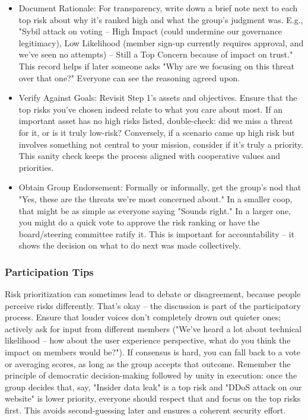 \begin{itemize}
    \item Document Rationale: For transparency, write down a brief note next to each top risk about why it's
    ranked high and what the group's judgment was. E.g., "Sybil attack on voting – High Impact (could undermine
    our governance legitimacy), Low Likelihood (member sign-up currently requires approval, and we've seen no
    attempts) – Still a Top Concern because of impact on trust." This record helps if later someone asks "Why are
    we focusing on this threat over that one?" Everyone can see the reasoning agreed upon.
    
    \item Verify Against Goals: Revisit Step 1's assets and objectives. Ensure that the top risks you've
    chosen indeed relate to what you care about most. If an important asset has no high risks listed,
    double-check: did we miss a threat for it, or is it truly low-risk? Conversely, if a scenario came up high
    risk but involves something not central to your mission, consider if it's truly a priority. This sanity check
    keeps the process aligned with cooperative values and priorities.
    
    \item Obtain Group Endorsement: Formally or informally, get the group's nod that "Yes, these are the
    threats we're most concerned about." In a smaller coop, that might be as simple as everyone saying "Sounds
    right." In a larger one, you might do a quick vote to approve the risk ranking or have the board/steering
    committee ratify it. This is important for accountability – it shows the decision on what to do next was made
    collectively.
\end{itemize}

\subsubsection{Participation Tips}

Risk prioritization can sometimes lead to debate or disagreement, because people
perceive risks differently. That's okay – the discussion is part of the
participatory process. Ensure that louder voices don't completely drown out
quieter ones; actively ask for input from different members ("We've heard a lot
about technical likelihood – how about the user experience perspective, what do
you think the impact on members would be?"). If consensus is hard, you can fall
back to a vote or averaging scores, as long as the group accepts that outcome.
Remember the principle of democratic decision-making followed by unity in
execution: once the group decides that, say, "Insider data leak" is a top risk
and "DDoS attack on our website" is lower priority, everyone should respect that
and focus on the top risks first. This avoids second-guessing later and ensures
a coherent security effort.

